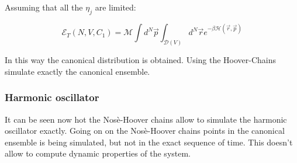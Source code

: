 		Assuming that all the $\eta_j$ are limited:

		$$\mathcal{E}_T(N, V, C_1) = \mathcal{M}\int d^N\vec{p}\int_{\mathcal{D}(V)}d^N\vec{r}e^{-\beta\mathcal{H}(\vec{r}, \vec{p})}$$

		In this way the canonical distribution is obtained.
		Using the Hoover-Chains simulate exactly the canonical ensemble.

		\subsubsection{Harmonic oscillator}
		It can be seen now hot the Nos\`e-Hoover chains allow to simulate the harmonic oscillator exactly.
		Going on on the Nos\`e-Hoover chains points in the canonical ensemble is being simulated, but not in the exact sequence of time.
		This doesn't allow to compute dynamic properties of the system.
